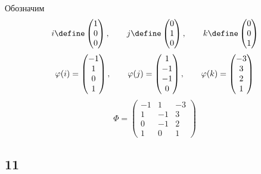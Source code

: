 Обозначим
$$ i \define
\begin{pmatrix}
	1 \\
    0 \\
    0
\end{pmatrix}, \qquad j \define
\begin{pmatrix}
	0 \\
    1 \\
    0
\end{pmatrix}, \qquad k \define
\begin{pmatrix}
	0 \\
    0 \\
    1
\end{pmatrix} $$
$$ \varphi(i) =
\begin{pmatrix}
	-1 \\
    1 \\
    0 \\
    1
\end{pmatrix}, \qquad \varphi(j) =
\begin{pmatrix}
	1 \\
    -1 \\
    -1 \\
    0
\end{pmatrix}, \qquad \varphi(k) =
\begin{pmatrix}
	-3 \\
    3 \\
    2 \\
    1
\end{pmatrix} $$
$$ \Phi =
\begin{pmatrix}
	-1 & 1 & -3 \\
    1 & -1 & 3 \\
    0 & -1 & 2 \\
    1 & 0 & 1
\end{pmatrix} $$

\subsection{11}

